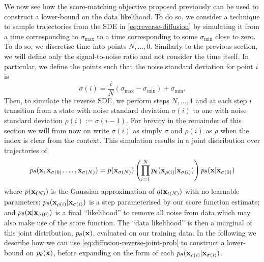 We now see how the score-matching objective proposed previously can be used to construct a lower-bound on the data likelihood. To do so, we consider a technique to sample trajectories from the SDE in \cref{eq:reverse-diffusion} by simulating it from a time corresponding to $\sigma_\text{max}$ to a time corresponding to some $\sigma_\text{min}$ close to zero. To do so, we discretise time into points $N,\ldots,0$. Similarly to the previous section, we will define only the signal-to-noise ratio and not consider the time itself. In particular, we define the points such that the noise standard deviation for point $i$ is
\begin{equation}
    \sigma(i) = \frac{i}{N}(\sigma_\text{max} - \sigma_\text{min}) + \sigma_\text{min}.
\end{equation}
Then, to simulate the reverse SDE, we perform steps $N,\ldots,1$ and at each step $i$ transition from a state with noise standard deviation $\sigma(i)$ to one with noise standard deviation $\rho(i) := \sigma(i-1)$. For brevity in the remainder of this section we will from now on write $\sigma(i)$ as simply $\sigma$ and $\rho(i)$ as $\rho$ when the index is clear from the context. This simulation results in a joint distribution over trajectories of
\begin{align} \label{eq:diffusion-reverse-joint-prob}
    p_\theta({\mathbf{x}},{\mathbf{x}}_{\sigma(0)},\ldots,{\mathbf{x}}_{\sigma(N)}) = p({\mathbf{x}}_{\sigma(N)}) \left( \prod_{i=1}^N p_\theta({\mathbf{x}}_{\rho(i)} | {\mathbf{x}}_{\sigma(i)}) \right) p_\theta({\mathbf{x}}|{\mathbf{x}}_{\sigma(0)})
\end{align}
where $p({\mathbf{x}}_{(N)})$ is the Gaussian approximation of $q({\mathbf{x}}_{t(N)})$ with no learnable parameters; $p_\theta({\mathbf{x}}_{\rho(i)} | {\mathbf{x}}_{\sigma(i)})$ is a step parameterised by our score function estimate; and $p_\theta({\mathbf{x}}|{\mathbf{x}}_{\sigma(0)})$ is a final ``likelihood'' to remove all noise from data which may also make use of the score function. The ``data likelihood'' is then a marginal of this joint distribution, $p_\theta({\mathbf{x}})$, evaluated on our training data. In the following we describe how we can use \cref{eq:diffusion-reverse-joint-prob} to construct a lower-bound on $p_\theta({\mathbf{x}})$, before expanding on the form of each $p_\theta({\mathbf{x}}_{\rho(i)}|{\mathbf{x}}_{\sigma(i)})$.

